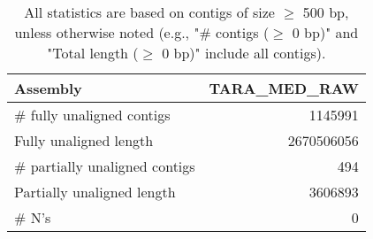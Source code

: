 \documentclass[12pt,a4paper]{article}
\begin{document}
\begin{table}[ht]
\begin{center}
\caption{All statistics are based on contigs of size $\geq$ 500 bp, unless otherwise noted (e.g., "\# contigs ($\geq$ 0 bp)" and "Total length ($\geq$ 0 bp)" include all contigs).}
\begin{tabular}{|l*{1}{|r}|}
\hline
Assembly & TARA\_MED\_RAW \\ \hline
\# fully unaligned contigs & 1145991 \\ \hline
Fully unaligned length & 2670506056 \\ \hline
\# partially unaligned contigs & 494 \\ \hline
Partially unaligned length & 3606893 \\ \hline
\# N's & 0 \\ \hline
\end{tabular}
\end{center}
\end{table}
\end{document}
